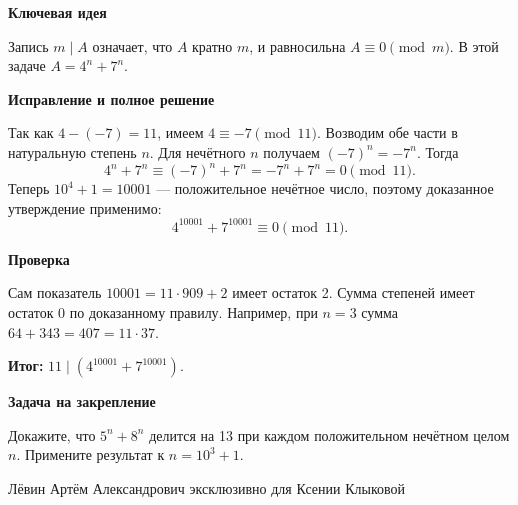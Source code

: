 \documentclass[a4paper,12pt]{article}
\newcommand{\block}[1]{\par\medskip\textbf{#1}\par\nopagebreak[3]}
\newcommand{\idea}{\block{\textcolor{blue!60!black}{Ключевая идея}}}
\newcommand{\result}[1]{\par\textcolor{accent}{\textbf{Итог:}} #1}
\newcommand{\practice}{\block{Задача на закрепление}}
\begin{document}
\idea
Запись $m\mid A$ означает, что $A$ кратно $m$, и равносильна $A\equiv0\pmod m$. В этой задаче $A=4^n+7^n$.
\block{Исправление и полное решение}
Так как $4-(-7)=11$, имеем $4\equiv-7\pmod{11}$. Возводим обе части в натуральную степень $n$. Для нечётного $n$ получаем $(-7)^n=-7^n$. Тогда
\[
4^n+7^n\equiv(-7)^n+7^n=-7^n+7^n=0\pmod{11}.
\]
Теперь $10^4+1=10001$ --- положительное нечётное число, поэтому доказанное утверждение применимо:
\[
4^{10001}+7^{10001}\equiv0\pmod{11}.
\]
\block{Проверка}
Сам показатель $10001=11\cdot909+2$ имеет остаток 2. Сумма степеней имеет остаток 0 по доказанному правилу. Например, при $n=3$ сумма $64+343=407=11\cdot37$.
\result{$11\mid(4^{10001}+7^{10001})$.}
\practice
Докажите, что $5^n+8^n$ делится на 13 при каждом положительном нечётном целом $n$. Примените результат к $n=10^3+1$.
\vfill
\begin{center}\small Лёвин Артём Александрович эксклюзивно для Ксении Клыковой\end{center}
\end{document}
